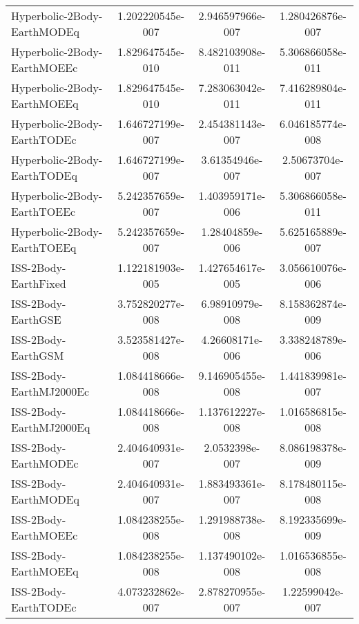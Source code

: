 \begin{table}[htbp!]
\begin{tabular}{lccc}
         Hyperbolic-2Body-EarthMODEq & 1.202220545e-007 & 2.946597966e-007 & 1.280426876e-007 \\
         Hyperbolic-2Body-EarthMOEEc & 1.829647545e-010 & 8.482103908e-011 & 5.306866058e-011 \\
         Hyperbolic-2Body-EarthMOEEq & 1.829647545e-010 & 7.283063042e-011 & 7.416289804e-011 \\
         Hyperbolic-2Body-EarthTODEc & 1.646727199e-007 & 2.454381143e-007 & 6.046185774e-008 \\
         Hyperbolic-2Body-EarthTODEq & 1.646727199e-007 & 3.61354946e-007 & 2.50673704e-007 \\
         Hyperbolic-2Body-EarthTOEEc & 5.242357659e-007 & 1.403959171e-006 & 5.306866058e-011 \\
         Hyperbolic-2Body-EarthTOEEq & 5.242357659e-007 & 1.28404859e-006 & 5.625165889e-007 \\
         ISS-2Body-EarthFixed & 1.122181903e-005 & 1.427654617e-005 & 3.056610076e-006 \\
         ISS-2Body-EarthGSE & 3.752820277e-008 & 6.98910979e-008 & 8.158362874e-009 \\
         ISS-2Body-EarthGSM & 3.523581427e-008 & 4.26608171e-006 & 3.338248789e-006 \\
         ISS-2Body-EarthMJ2000Ec & 1.084418666e-008 & 9.146905455e-008 & 1.441839981e-007 \\
         ISS-2Body-EarthMJ2000Eq & 1.084418666e-008 & 1.137612227e-008 & 1.016586815e-008 \\
         ISS-2Body-EarthMODEc & 2.404640931e-007 & 2.0532398e-007 & 8.086198378e-009 \\
         ISS-2Body-EarthMODEq & 2.404640931e-007 & 1.883493361e-007 & 8.178480115e-008 \\
         ISS-2Body-EarthMOEEc & 1.084238255e-008 & 1.291988738e-008 & 8.192335699e-009 \\
         ISS-2Body-EarthMOEEq & 1.084238255e-008 & 1.137490102e-008 & 1.016536855e-008 \\
         ISS-2Body-EarthTODEc & 4.073232862e-007 & 2.878270955e-007 & 1.22599042e-007 \\

\end{tabular}
\end{table}
